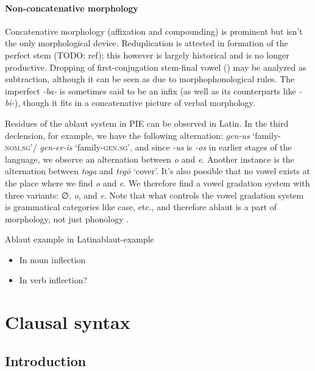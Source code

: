 \documentclass[a4paper, oneside, 12pt]{report}
\newcommand*{\citepage}[1]{p.~{#1}}
\newcommand{\form}[1]{\emph{#1}}
\newcommand*{\category}[1]{\textsc{#1}}
\newcommand{\translate}[1]{`#1'}
\begin{document}
\paragraph*{Non-concatenative morphology}

Concatenative morphology (affixation and compounding) 
is prominent but isn't the only morphological device.
Reduplication is attested in 
formation of the perfect stem (TODO: ref);
this however is largely historical 
and is no longer productive.
Dropping of first-conjugation stem-final vowel ()
may be analyzed as subtraction,
although it can be seen as due to morphophonological rules.
The imperfect \form{-ba-} is sometimes said to be an infix 
(as well as its counterparts like \form{-bi-}),
though it fits in a concatenative picture of verbal morphology.

Residues of the ablaut system in PIE can be observed in Latin.
In the third declension, for example,
we have the following alternation:
\form{gen-us} \translate{family-\category{nom.sg}}/
\form{gen-er-is} \translate{family-\category{gen.sg}},
and since \form{-us} is \form{-os} in earlier stages of the language,
we observe an alternation between \form{o} and \form{e}.
Another instance is the alternation between \form{toga} and \form{teg\={o}} \translate{cover}.
It's also possible that no vowel exists at the place where we find \form{o} and \form{e}.
We therefore find a vowel gradation system with three variants:
∅, \form{o}, and \form{e}.
Note that what controls the vowel gradation system is grammatical categories like case, etc.,
and therefore ablaut is a part of morphology, not just phonology
\citep[\citepage{46}]{weiss2009outline}.

\begin{todobox}{Ablaut example in Latin}{ablaut-example}
    \begin{itemize}
        \item In noun inflection
        \item In verb inflection?
    \end{itemize}
\end{todobox}

\section{Clausal syntax}\label{sec:grammatical.clause}

\subsection{Introduction}
\end{document}
